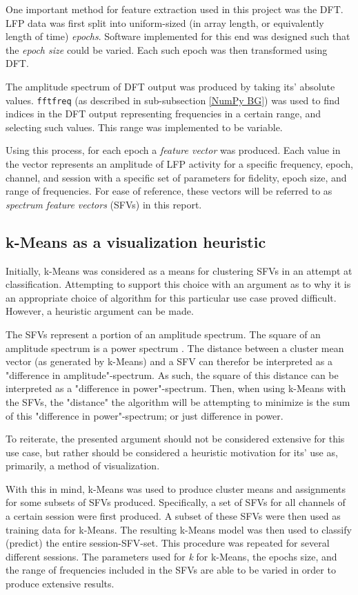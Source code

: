 \documentclass{article}
\begin{document}
One important method for feature extraction used in this project was the DFT. 
LFP data was first split into uniform-sized (in array length, or equivalently length of time) \textit{epochs}.
Software implemented for this end was designed such that the \textit{epoch size} could be varied.
Each such epoch was then transformed using DFT.

The amplitude spectrum of DFT output was produced by taking its' absolute values. 
\texttt{fftfreq} (as described in sub-subsection \ref{NumPy BG}) was used to find indices in the DFT output representing frequencies in a certain range, and selecting such values.
This range was implemented to be variable.

Using this process, for each epoch a \textit{feature vector} was produced. 
Each value in the vector represents an amplitude of LFP activity for a specific frequency, epoch, channel, and session with a specific set of parameters for fidelity, epoch size, and range of frequencies.
For ease of reference, these vectors will be referred to as \textit{spectrum feature vectors} (SFVs) in this report.

\subsection{k-Means as a visualization heuristic}\label{KM Method}

Initially, k-Means was considered as a means for clustering SFVs in an attempt at classification. 
Attempting to support this choice with an argument as to why it is an appropriate choice of algorithm for this particular use case proved difficult.
However, a heuristic argument can be made.

The SFVs represent a portion of an amplitude spectrum. 
The square of an amplitude spectrum is a power spectrum \citep{numpy}.
The distance between a cluster mean vector (as generated by k-Means) and a SFV can therefor be interpreted as a "difference in amplitude"-spectrum.
As such, the square of this distance can be interpreted as a "difference in power"-spectrum.
Then, when using k-Means with the SFVs, the "distance" the algorithm will be attempting to minimize is the sum of this "difference in power"-spectrum; or just difference in power.

To reiterate, the presented argument should not be considered extensive for this use case, but rather should be considered a heuristic motivation for its' use as, primarily, a method of visualization.

With this in mind, k-Means was used to produce cluster means and assignments for some subsets of SFVs produced.
Specifically, a set of SFVs for all channels of a certain session were first produced.
A subset of these SFVs were then used as training data for k-Means.
The resulting k-Means model was then used to classify (predict) the entire session-SFV-set.
This procedure was repeated for several different sessions.
The parameters used for \textit{k} for k-Means, the epochs size, and the range of frequencies included in the SFVs are able to be varied in order to produce extensive results. 
\end{document}
